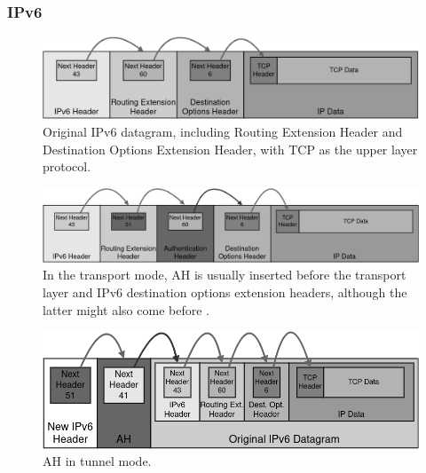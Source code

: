 \documentclass[a4paper,12pt]{report}
\begin{document}
		\newpage
		\subsubsection{IPv6}
		\begin{figure}[!h]
			\includegraphics[width=\textwidth]{original_ipv6_packet}
			\centering
			\caption{Original IPv6 datagram, including Routing Extension Header and Destination Options Extension Header, with TCP as the upper layer protocol.}
		\end{figure}
		
		\begin{figure}[h]
			\includegraphics[width=\textwidth]{ah_ipv6_transport}
			\centering
			\caption{In the transport mode, AH is usually inserted before the transport layer and IPv6 destination options extension headers, although the latter might also come before \cite{rfc4302}.}
		\end{figure}
		
		\begin{figure}[!h]
			\includegraphics[width=\textwidth]{ah_ipv6_tunnel}
			\centering
			\caption{AH in tunnel mode.}
		\end{figure}
	
		
\end{document}
